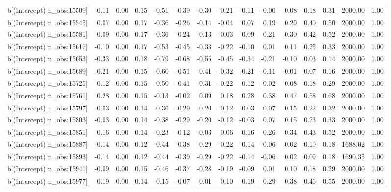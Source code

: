 \begin{table}[ht]
\begin{tabular}{rrrrrrrrrrrrrrr}
  b[(Intercept) n\_obs:15509] & -0.11 & 0.00 & 0.15 & -0.51 & -0.39 & -0.30 & -0.21 & -0.11 & -0.00 & 0.08 & 0.18 & 0.31 & 2000.00 & 1.00 \\ 
  b[(Intercept) n\_obs:15545] & 0.07 & 0.00 & 0.17 & -0.36 & -0.26 & -0.14 & -0.04 & 0.07 & 0.19 & 0.29 & 0.40 & 0.50 & 2000.00 & 1.00 \\ 
  b[(Intercept) n\_obs:15581] & 0.09 & 0.00 & 0.17 & -0.36 & -0.24 & -0.13 & -0.03 & 0.09 & 0.21 & 0.30 & 0.42 & 0.52 & 2000.00 & 1.00 \\ 
  b[(Intercept) n\_obs:15617] & -0.10 & 0.00 & 0.17 & -0.53 & -0.45 & -0.33 & -0.22 & -0.10 & 0.01 & 0.11 & 0.25 & 0.33 & 2000.00 & 1.00 \\ 
  b[(Intercept) n\_obs:15653] & -0.33 & 0.00 & 0.18 & -0.79 & -0.68 & -0.55 & -0.45 & -0.34 & -0.21 & -0.10 & 0.03 & 0.14 & 2000.00 & 1.00 \\ 
  b[(Intercept) n\_obs:15689] & -0.21 & 0.00 & 0.15 & -0.60 & -0.51 & -0.41 & -0.32 & -0.21 & -0.11 & -0.01 & 0.07 & 0.16 & 2000.00 & 1.00 \\ 
  b[(Intercept) n\_obs:15725] & -0.12 & 0.00 & 0.15 & -0.50 & -0.41 & -0.31 & -0.22 & -0.12 & -0.02 & 0.08 & 0.18 & 0.29 & 2000.00 & 1.00 \\ 
  b[(Intercept) n\_obs:15761] & 0.28 & 0.00 & 0.15 & -0.13 & -0.02 & 0.09 & 0.18 & 0.28 & 0.38 & 0.47 & 0.58 & 0.68 & 2000.00 & 1.00 \\ 
  b[(Intercept) n\_obs:15797] & -0.03 & 0.00 & 0.14 & -0.36 & -0.29 & -0.20 & -0.12 & -0.03 & 0.07 & 0.15 & 0.22 & 0.32 & 2000.00 & 1.00 \\ 
  b[(Intercept) n\_obs:15803] & -0.03 & 0.00 & 0.14 & -0.38 & -0.29 & -0.20 & -0.12 & -0.03 & 0.07 & 0.15 & 0.23 & 0.33 & 2000.00 & 1.00 \\ 
  b[(Intercept) n\_obs:15851] & 0.16 & 0.00 & 0.14 & -0.23 & -0.12 & -0.03 & 0.06 & 0.16 & 0.26 & 0.34 & 0.43 & 0.52 & 2000.00 & 1.00 \\ 
  b[(Intercept) n\_obs:15887] & -0.14 & 0.00 & 0.12 & -0.44 & -0.38 & -0.29 & -0.22 & -0.14 & -0.06 & 0.02 & 0.10 & 0.18 & 1688.02 & 1.00 \\ 
  b[(Intercept) n\_obs:15893] & -0.14 & 0.00 & 0.12 & -0.44 & -0.39 & -0.29 & -0.22 & -0.14 & -0.06 & 0.02 & 0.09 & 0.18 & 1690.35 & 1.00 \\ 
  b[(Intercept) n\_obs:15941] & -0.09 & 0.00 & 0.15 & -0.46 & -0.37 & -0.28 & -0.19 & -0.09 & 0.01 & 0.10 & 0.18 & 0.29 & 2000.00 & 1.00 \\ 
  b[(Intercept) n\_obs:15977] & 0.19 & 0.00 & 0.14 & -0.15 & -0.07 & 0.01 & 0.10 & 0.19 & 0.29 & 0.38 & 0.46 & 0.55 & 2000.00 & 1.00 \\ 

\end{tabular}
\end{table}
